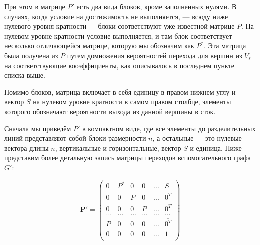 	При этом в матрице $P'$ есть два вида блоков, кроме заполненных нулями. В случаях, когда условие на достижимость не выполняется, --- всюду ниже нулевого уровня кратности --- блоки соответствуют уже известной матрице $P$. На нулевом уровне кратности условие выполняется, и там блок соответствует несколько отличающейся матрице, которую мы обозначим как $P^*$. Эта матрица была получена из $P$ путем домножения вероятностей перехода для вершин из $V_s$ на соответствующие кооэффициенты, как описывалось в последнем пункте списка выше.

	Помимо блоков, матрица включает в себя единицу в правом нижнем углу и вектор $S$ на нулевом уровне кратности в самом правом столбце, элементы которого обозначают вероятности выхода из данной вершины в сток.	

	Сначала мы приведём $P'$ в компактном виде, где все элементы до разделительных линий представляют собой блоки размерности $n$, а остальные --- это нулевые вектора длины $n$, вертикальные и горизонтальные, вектор $S$ и единица. Ниже представим более детальную запись матрицы переходов вспомогательного графа $G'$:
	
	\begin{displaymath}
		\mathbf{P'} =
		\left( \begin{array}{ccccc|c}
		0 & P^* & 0 & 0 & ... & S \\
		0 & 0 & P & 0 & ... & \overline {0^T} \\
		0 & 0 & 0 & P & ... & \overline {0^T} \\
		... & ... & ... & ... & ... & ... \\
		P & 0 & 0 & 0 & ... & \overline {0^T} \\
		\hline
		 \overline 0 &  \overline 0 &  \overline 0 &  \overline 0 & ... & 1 \\
		\end{array} \right)
	\end{displaymath}
	
